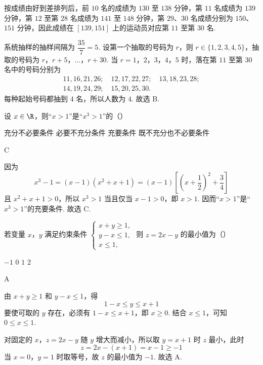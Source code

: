 \begin{solution}
按成绩由好到差排列后，前 \(10\) 名的成绩为 \(130\) 至 \(138\) 分钟，第 \(11\) 名成绩为 \(139\) 分钟，第 \(12\) 至第 \(28\) 名成绩为 \(141\) 至 \(148\) 分钟，第 \(29\)、\(30\) 名成绩分别为 \(150\)、\(151\) 分钟，因此成绩在 \([139,151]\) 上的运动员对应第 \(11\) 至第 \(30\) 名.

系统抽样的抽样间隔为 \(\dfrac{35}{7}=5\). 设第一个抽取的号码为 \(r\)，则 \(r\in\{1,2,3,4,5\}\)，抽取的号码为 \(r\)，\(r+5\)，\(\ldots\)，\(r+30\). 当 \(r=1\)，\(2\)，\(3\)，\(4\)，\(5\) 时，落在第 \(11\) 至第 \(30\) 名中的号码分别为
\[
\begin{gathered}
11,16,21,26;\quad 12,17,22,27;\quad 13,18,23,28;\\
14,19,24,29;\quad 15,20,25,30.
\end{gathered}
\]
每种起始号码都抽到 \(4\) 名，所以人数为 \(4\). 故选 B.
\end{solution}

\begin{problem}
设 \(x \in \R\)，则“\(x > 1\)”是“\(x^3 > 1\)”的（\quad）

\choices
    {充分不必要条件}
    {必要不充分条件}
    {充要条件}
    {既不充分也不必要条件}
\end{problem}

\begin{answer}
C
\end{answer}

\begin{solution}
因为
\[
x^3-1=(x-1)(x^2+x+1)=(x-1)\left[\left(x+\frac12\right)^2+\frac34\right]
\]
且 \(x^2+x+1>0\)，所以 \(x^3>1\) 当且仅当 \(x-1>0\)，即 \(x>1\). 因而“\(x>1\)”是“\(x^3>1\)”的充要条件. 故选 C.
\end{solution}

\begin{problem}
若变量 \(x\)，\(y\) 满足约束条件 \(\begin{cases}
x + y \geqslant 1,\\
y - x \leqslant 1,\\
x \leqslant 1,
\end{cases}\) 则 \(z = 2x - y\) 的最小值为（\quad）

\choices
    {\(-1\)}
    {\(0\)}
    {\(1\)}
    {\(2\)}
\end{problem}

\begin{answer}
A
\end{answer}

\begin{solution}
由 \(x+y\geqslant1\) 和 \(y-x\leqslant1\)，得
\[
1-x\leqslant y\leqslant x+1
\]
要使可取的 \(y\) 存在，必须有 \(1-x\leqslant x+1\)，即 \(x\geqslant0\). 结合 \(x\leqslant1\)，可知 \(0\leqslant x\leqslant1\).

对固定的 \(x\)，\(z=2x-y\) 随 \(y\) 增大而减小，所以取 \(y=x+1\) 时 \(z\) 最小，此时
\[
z=2x-(x+1)=x-1\geqslant-1
\]
当 \(x=0\)，\(y=1\) 时取等号，故 \(z\) 的最小值为 \(-1\). 故选 A.
\end{solution}

